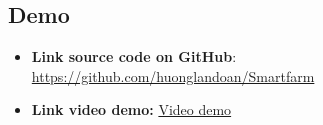 \subsection{Demo}
\begin{itemize}
  \item \textbf{Link source code on GitHub}: \href{https://github.com/huonglandoan/Smartfarm}{https://github.com/huonglandoan/Smartfarm}
  \item \textbf{Link video demo:} \href{https://youtu.be/-sP-Kj_6f_g}{Video demo}
\end{itemize}
